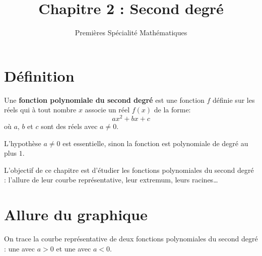 \documentclass{article}
\title{Chapitre 2 : Second degré}
\date{}
\author{Premières Spécialité Mathématiques}
\begin{document}
\maketitle

\section{Définition}

\begin{tcolorbox}
\begin{definition}
Une \textbf{fonction polynomiale du second degré} est une fonction $f$ définie sur les réels qui à tout nombre $x$ associe un réel $f(x)$ de la forme:
\begin{equation*}
ax^2+bx+c   
\end{equation*}
où $a$, $b$ et $c$ sont des réels avec $a \neq 0$. 
\end{definition}
\end{tcolorbox}
\begin{remark}
L'hypothèse $a \neq 0$ est essentielle, sinon la fonction est polynomiale de degré au plus $1$.    
\end{remark}
L'objectif de ce chapitre est d'étudier les fonctions polynomiales du second degré : l'allure de leur courbe représentative, leur extremum, leurs racines\dots
\section{Allure du graphique}
On trace la courbe représentative de deux fonctions polynomiales du second degré : une avec $a > 0$ et une avec $a < 0$.
\end{document}
